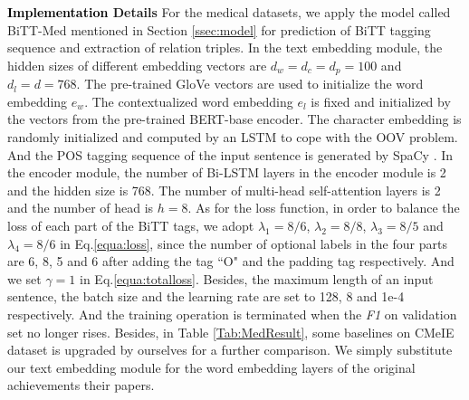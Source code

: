 \documentclass[conference]{IEEEtran}
\newcommand{\yankun}[1]{\textcolor{black}{#1}}
\begin{document}
\textbf{\yankun{Implementation} Details}
For the medical datasets, we apply the model called BiTT-Med mentioned in Section \ref{ssec:model} for prediction of BiTT tagging sequence and extraction of relation triples. In the text embedding module, the hidden sizes of different embedding vectors are $d_w = d_c = d_p = 100$ and $d_l = d = 768$. The pre-trained GloVe \cite{Pennington2014Glove} vectors are used to initialize the word embedding $e_w$. The contextualized word embedding $e_l$ is fixed and initialized by the vectors from the pre-trained BERT-base encoder. The character embedding is randomly initialized and computed by an LSTM \cite{Lample2016Neural} to cope with the OOV problem. And the POS tagging sequence of the input sentence is generated by SpaCy \cite{Honnibal2015An}. In the encoder module, the number of Bi-LSTM layers in the encoder module is 2 and the hidden size is 768. The number of multi-head self-attention layers is 2 and the number of head is $h = 8$. As for the loss function, in order to balance the loss of each part of the BiTT tags, we adopt $\lambda_1 = 8/6 $, $\lambda_2 = 8/8$, $\lambda_3 = 8/5$ and $\lambda_4 = 8/6$ in Eq.\eqref{equa:loss}, since the number of optional labels in the four parts are 6, 8, 5 and 6 after adding the tag ``O" and the padding tag respectively. And we set $\gamma = 1$ in Eq.\eqref{equa:totalloss}. Besides, the maximum length of an input sentence, the batch size and the learning rate are set to 128, 8 and 1e-4 respectively. And the training operation is terminated when the \emph{F1} on validation set no longer rises. Besides, in Table \ref{Tab:MedResult}, some baselines on CMeIE dataset is upgraded by ourselves for a further comparison. We simply substitute our text embedding module for the word embedding layers of the original achievements their papers.
\end{document}
